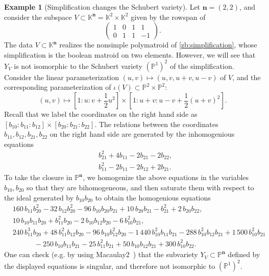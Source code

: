 \documentclass[11pt]{article}
\theoremstyle{definition}
\newtheorem{exam}[theo]{Example}
\numberwithin{equation}{section}
\renewcommand{\P}{\mathbb{P}}
\newcommand{\K}{\mathbb{K}}
\begin{document}
\begin{exam}[Simplification changes the Schubert variety]
    Let $\mathbf{n} = (2,2)$, and consider the subspace $V \subset \K^{\mathbf{n}} = \K^2 \times \K^2$ given by the rowspan of
    \[
    \begin{pmatrix}
        1 & 0 & 1 & 1\\
        0 & 1 & 1 & -1
    \end{pmatrix}.
    \]
    The data $V \subset \K^{\mathbf{n}}$ realizes the nonsimple polymatroid of \cref{zb:simplification}, whose simplification is the boolean matroid on two elements. However, we will see that $Y_V$ is not isomorphic to the Schubert variety $(\P^1)^2$ of the simplification. Consider the linear parameterization $(u,v) \mapsto (u,v,u+v,u-v)$ of $V$, and the corresponding parameterization of $\iota(V) \subset \P^2 \times \P^2$:
    \[
    (u,v) \mapsto [1:u:v + \frac12 u^2] \times [1:u+v: u-v + \frac12(u+v)^2].
    \]
    Recall that we label the coordinates on the right hand side as $[b_{10}:b_{11}:b_{12}] \times [b_{20}:b_{21}:b_{22}]$. The relations between the coordinates $b_{11},b_{12},b_{21},b_{22}$ on the right hand side are generated by the inhomogenious equations
    \begin{align*}
        &b_{21}^2 + 4b_{11} - 2b_{21} - 2b_{22},\\
        &b_{11}^2 - 2b_{11} - 2b_{12} + 2b_{21}.
    \end{align*}
    To take the closure in $\P^{\mathbf{n}}$, we homogenize the above equations in the variables $b_{10},b_{20}$ so that they are bihomogeneous, and then saturate them with respect to the ideal generated by $b_{10}b_{20}$ to obtain the homogenious equations
    \begin{align*}
        &160\,b_{11}b_{20}^{2}-32\,b_{12}b_{20}^{2}-96\,b_{10}b_{20}b_{21}+10\,b_{20}b_{21}-b_{21}^{2}+2\,b_{20}b_{22},\\
        &10\,b_{10}b_{11}b_{20}+b_{11}^{2}b_{20}-2\,b_{10}b_{12}b_{20}-6\,b_{10}^{2}b_{21},\\
        &240\,b_{11}^{3}b_{20}+48\,b_{11}^{2}b_{12}b_{20}-96\,b_{10}b_{12}^{2}b_{20}-1\,440\,b_{10}^{2}b_{11}b_{21}-288\,b_{10}^{2}b_{12}b_{21}+1\,500\,b_{10}^{2}b_{21}\\
        &\quad\quad\quad-250\,b_{10}b_{11}b_{21}-25\,b_{11}^{2}b_{21}+50\,b_{10}b_{12}b_{21}+300\,b_{10}^{2}b_{22}.
    \end{align*}
    One can check (e.g. by using Macaulay2~\cite{M2}) that the subvariety $Y_V \subset\P^{\mathbf{n}}$ defined by the displayed equations is singular, and therefore not isomorphic to $(\P^1)^2$. 
\end{exam}
\end{document}
